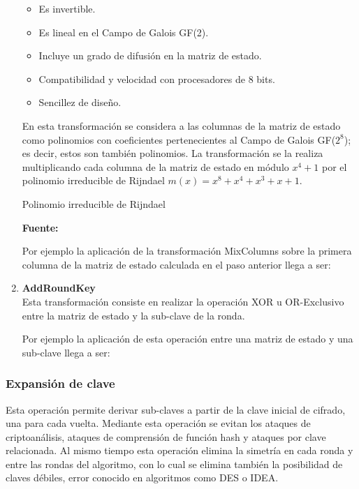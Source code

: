 \documentclass[../main/main.tex]{subfiles}
\begin{document}
\begin{enumerate}[label=\textbf{\arabic*}.]
          \begin{itemize}[noitemsep,nolistsep]
            \item Es invertible.
            \item Es lineal en el Campo de Galois GF(2).
            \item Incluye un grado de difusión en la matriz de estado.
            \item Compatibilidad y velocidad con procesadores de 8 bits.
            \item Sencillez de diseño.
          \end{itemize}

          En esta transformación se considera a las columnas de la matriz de estado como polinomios con coeficientes pertenecientes al Campo de Galois GF($2^8$); es decir, estos son también polinomios. La transformación se la realiza multiplicando cada columna de la matriz de estado en módulo $x^4 + 1$ por el polinomio irreducible de Rijndael $m(x) = x^8 + x^4 + x^3 + x + 1$.

          \begin{table}[H]
            \centering
            \caption{Polinomio irreducible de Rijndael}
            
            \caption*{\textbf{Fuente:} \cite{report:seguridad_europea_eeuu}}
          \end{table}

          Por ejemplo la aplicación de la transformación MixColumns sobre la primera columna de la matriz de estado calculada en el paso anterior llega a ser:

          

        \item \textbf{AddRoundKey} \\
          Esta transformación consiste en realizar la operación XOR u OR-Exclusivo entre la matriz de estado y la sub-clave de la ronda.

          Por ejemplo la aplicación de esta operación entre una matriz de estado y una sub-clave llega a ser:

          
      \end{enumerate}

    \subsubsection{Expansión de clave}
      Esta operación permite derivar sub-claves a partir de la clave inicial de cifrado, una para cada vuelta. Mediante esta operación se evitan los ataques de criptoanálisis, ataques de comprensión de función hash y ataques por clave relacionada. Al mismo tiempo esta operación elimina la simetría en cada ronda y entre las rondas del algoritmo, con lo cual se elimina también la posibilidad de claves débiles, error conocido en algoritmos como DES o IDEA.
\end{document}
